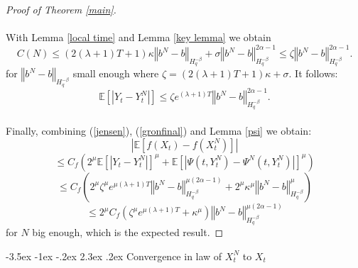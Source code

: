 \documentclass[11pt]{enstaPRE}
\makeatletter
\renewcommand\section{\@startsection {section}{1}{\z@}%
    {-3.5ex \@plus -1ex \@minus -.2ex}%
    {2.3ex \@plus.2ex}%
    {\centering\large\scshape\bfseries}}
\newcommand{\norme}[1]{\left\Vert #1\right\Vert}
\newcommand{\E}{\mathbb{E}}
\makeatother
\begin{document}
\begin{proof}[Proof of Theorem \ref{main}]
    \paragraph{}
    With Lemma \ref{local time} and Lemma \ref{key lemma} we obtain \begin{equation*}
    C(N) \leq (2(\lambda + 1)T+1)\kappa\norme{b^N-b}_{H^{-\beta}_{q}}   + \sigma\norme{b^N-b}_{H^{-\beta}_{q}}^{2\alpha-1} \leq \zeta \norme{b^N-b}_{H^{-\beta}_{q}}^{2\alpha-1}.
    \end{equation*}   
    for $\norme{b^N-b}_{H^{-\beta}_{q}}$ small enough where $\zeta = (2(\lambda + 1)T+1)\kappa + \sigma $. It follows:
    \begin{equation}\label{gronfinal}
    \E\left[\left|Y_t-Y_t^N\right|\right] \leq \zeta e^{(\lambda + 1)T} \norme{b^N-b}_{H^{-\beta}_{q}}^{2\alpha-1}.
    \end{equation}
    
    \paragraph{}
    Finally, combining (\ref{jensen}), (\ref{gronfinal}) and Lemma \ref{psi} we obtain:    
    \begin{equation*}
    \left|\E\left[f\left(X_t\right)-f\left(X_t^N\right)\right]\right| 
    \end{equation*}
    \begin{equation*}
    \leq C_f  \left(2^\mu\E\left[\left|Y_t-Y_t^N\right|\right]^\mu+\E\left[\left|\Psi\left(t,Y_t^N\right)-\Psi^N\left(t,Y_t^N\right)\right|\right]^\mu\right)
    \end{equation*} 
    \begin{equation*}
    \leq C_f  \left(2^\mu\zeta^\mu e^{\mu(\lambda+1)T} \norme{b^N-b}_{H^{-\beta}_{q}}^{\mu(2\alpha-1)} + 2^\mu \kappa^\mu \norme{b^N-b}_{H^{-\beta}_q}^\mu\right)
    \end{equation*}
    \begin{equation}
    \leq 2^\mu C_f  \left(\zeta^\mu e^{\mu(\lambda+1)T} +  \kappa^\mu\right)\norme{b^N-b}_{H^{-\beta}_{q}}^{\mu(2\alpha-1)}
    \end{equation}       
    for $N$ big enough, which is the expected result.    
\end{proof}   


\section{Convergence in law of $X^N_t$ to $X_t$}
\end{document}
